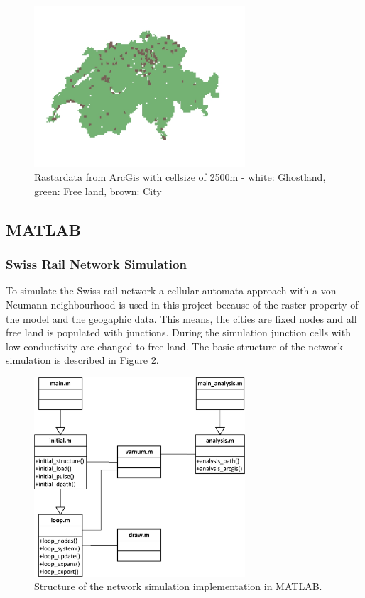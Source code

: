 \documentclass[11pt]{scrartcl}
\begin{document}
\begin{figure}[H]
	\centering
	\includegraphics[width=0.7\textwidth]{figures/map_2500_cities}
	\caption{Rastardata from ArcGis with cellsize of 2500m - white: Ghostland, green: Free land, brown: City}
	\label{fig:map_cities}
\end{figure}


\subsection{MATLAB}

\subsubsection{Swiss Rail Network Simulation}

To simulate the Swiss rail network a cellular automata approach with a von Neumann neighbourhood is used in this project because of the raster property of the model and the geogaphic data. This means, the cities are fixed nodes and all free land is populated with junctions. During the simulation junction cells with low conductivity are changed to free land. The basic structure of the network simulation is described in Figure \ref{fig:structure}.

\begin{figure}[H]
	\centering
	\includegraphics[width=0.7\textwidth]{figures/source_code}
	\caption{Structure of the network simulation implementation in MATLAB.}
	\label{fig:structure}
\end{figure}
\end{document}
